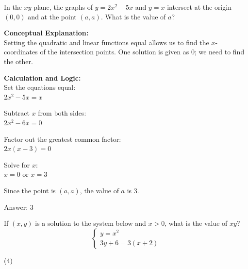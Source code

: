 \documentclass[11pt,paper=a4,answers]{exam}
\begin{document}
\begin{questions}
\vspace{40pt}

\question
In the $xy$-plane, the graphs of $y = 2x^2 - 5x$ and $y = x$ intersect at the origin $(0, 0)$ and at the point $(a, a)$. What is the value of $a$?

\begin{solution}
\textbf{Conceptual Explanation:} \\
Setting the quadratic and linear functions equal allows us to find the $x$-coordinates of the intersection points. One solution is given as 0; we need to find the other.

\vspace{20pt}

\textbf{Calculation and Logic:} \\
Set the equations equal: \\
$2x^2 - 5x = x$

\vspace{10pt}

Subtract $x$ from both sides: \\
$2x^2 - 6x = 0$

\vspace{10pt}

Factor out the greatest common factor: \\
$2x(x - 3) = 0$

\vspace{10pt}

Solve for $x$: \\
$x = 0$ or $x = 3$

\vspace{10pt}

Since the point is $(a, a)$, the value of $a$ is 3.

\vspace{25pt}

Answer: \colorbox{yellow!100}{3}
\end{solution}

\vspace{40pt}

\question
If $(x, y)$ is a solution to the system below and $x > 0$, what is the value of $xy$?
\[ \begin{cases} y = x^2 \\ 3y + 6 = 3(x + 2) \end{cases} \]
\begin{tasks}(4)
\end{tasks}


\end{questions}
\end{document}
